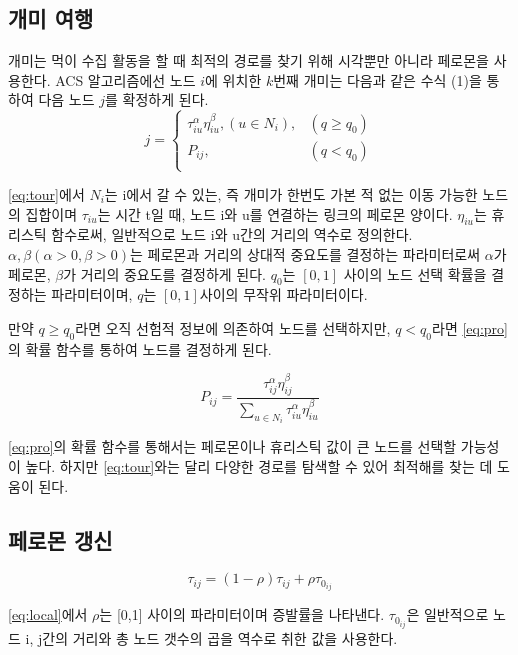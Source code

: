 \documentclass{kcc}
\begin{document}
\subsection{개미 여행}
 개미는 먹이 수집 활동을 할 때 최적의 경로를 찾기 위해 시각뿐만 아니라 페로몬을 사용한다. ACS 알고리즘에선 노드 $i$에 위치한 $k$번째 개미는 다음과 같은 수식 (1)을 통하여 다음 노드 $j$를 확정하게 된다.
\begin{equation} \label{eq:tour} \tag{1}
	j = \begin{cases}
 		\tau_{iu}^{\alpha} \eta_{iu}^{\beta}, (u \in N_i), & (q \ge q_0) \\
		P_{ij}, & (q < q_0) \\
	\end{cases}
\end{equation}

\eqref{eq:tour}에서 $N_i$는 i에서 갈 수 있는, 즉 개미가 한번도 가본 적 없는 이동 가능한 노드의 집합이며 $\tau_{iu}$는 시간 t일 때, 노드 i와 u를 연결하는 링크의 페로몬 양이다. $\eta_{iu}$는 휴리스틱 함수로써, 일반적으로 노드 i와 u간의 거리의 역수로 정의한다. $\alpha, \beta (\alpha > 0, \beta > 0)$는 페로몬과 거리의 상대적 중요도를 결정하는 파라미터로써 $\alpha$가 페로몬, $\beta$가 거리의 중요도를 결정하게 된다. $q_0$는 $[0, 1]$ 사이의 노드 선택 확률을 결정하는 파라미터이며, $q$는 $[0, 1]$사이의 무작위 파라미터이다.

만약 $q \ge q_0$라면 오직 선험적 정보에 의존하여 노드를 선택하지만, $q < q_0$라면 \eqref{eq:pro}의 확률 함수를 통하여 노드를 결정하게 된다.

\begin{equation} \label{eq:pro} \tag{2}
	P_{ij} = \frac{\tau_{ij}^{\alpha} \eta_{ij}^{\beta}}{\sum_{u \in N_i} \tau_{iu}^{\alpha} \eta_{iu}^{\beta}}
\end{equation}

\eqref{eq:pro}의 확률 함수를 통해서는 페로몬이나 휴리스틱 값이 큰 노드를 선택할 가능성이 높다. 하지만 \eqref{eq:tour}와는 달리 다양한 경로를 탐색할 수 있어 최적해를 찾는 데 도움이 된다.

\subsection{페로몬 갱신}

\begin{equation} \label{eq:local} \tag{4}
	\tau_{ij} = (1 - \rho) \tau_{ij} + \rho \tau_{0_{ij}}
\end{equation}

\eqref{eq:local}에서 $\rho$는 [0,1] 사이의 파라미터이며 증발률을 나타낸다. $\tau_{0_{ij}}$은 일반적으로 노드 i, j간의 거리와 총 노드 갯수의 곱을 역수로 취한 값을 사용한다. 
\end{document}
